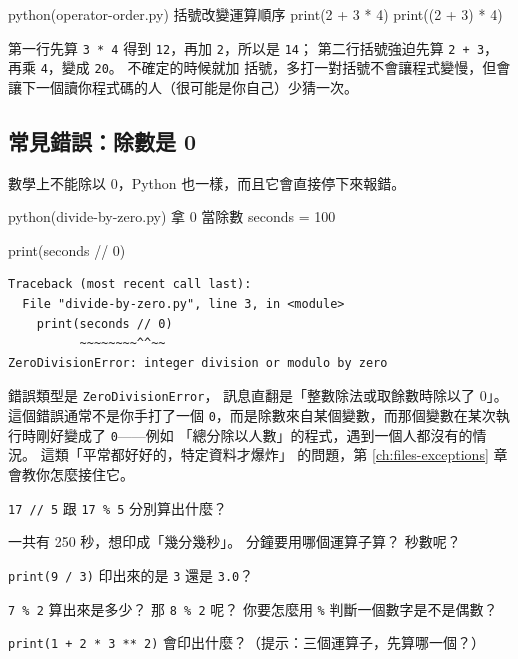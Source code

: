 \begin{example}{python}{(operator-order.py) 括號改變運算順序}
print(2 + 3 * 4)
print((2 + 3) * 4)
\end{example}


第一行先算 \texttt{3 * 4} 得到 \texttt{12}，再加 \texttt{2}，所以是 \texttt{14}；
第二行括號強迫先算 \texttt{2 + 3}，再乘 \texttt{4}，變成 \texttt{20}。 不確定的時候就加
括號，多打一對括號不會讓程式變慢，但會讓下一個讀你程式碼的人（很可能是你自己）少猜一次。

\subsection*{常見錯誤：除數是 0}

數學上不能除以 0，Python 也一樣，而且它會直接停下來報錯。

\begin{example}{python}{(divide-by-zero.py) 拿 0 當除數}
seconds = 100

print(seconds // 0)
\end{example}

\begin{verbatim}
Traceback (most recent call last):
  File "divide-by-zero.py", line 3, in <module>
    print(seconds // 0)
          ~~~~~~~~^^~~
ZeroDivisionError: integer division or modulo by zero
\end{verbatim}

錯誤類型是 \texttt{ZeroDivisionError}，
訊息直翻是「整數除法或取餘數時除以了 0」。 這個錯誤通常不是你手打了一個
\texttt{0}，而是除數來自某個變數，而那個變數在某次執行時剛好變成了 \texttt{0}——例如
「總分除以人數」的程式，遇到一個人都沒有的情況。 這類「平常都好好的，特定資料才爆炸」
的問題，第 \ref{ch:files-exceptions} 章會教你怎麼接住它。

\begin{drills}[label=drills:arithmetic]
\item \texttt{17 // 5} 跟 \texttt{17 \% 5} 分別算出什麼？
\item 一共有 250 秒，想印成「幾分幾秒」。 分鐘要用哪個運算子算？ 秒數呢？
\item \texttt{print(9 / 3)} 印出來的是 \texttt{3} 還是 \texttt{3.0}？
\item \texttt{7 \% 2} 算出來是多少？ 那 \texttt{8 \% 2} 呢？ 你要怎麼用 \texttt{\%}
判斷一個數字是不是偶數？
\item \texttt{print(1 + 2 * 3 ** 2)} 會印出什麼？（提示：三個運算子，先算哪一個？）
\end{drills}

